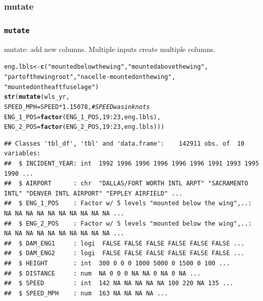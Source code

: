 \documentclass{beamer}\usepackage[]{graphicx}\usepackage[]{color}
\makeatletter
\newcommand{\hlnum}[1]{\textcolor[rgb]{0.686,0.059,0.569}{#1}}%
\newcommand{\hlstr}[1]{\textcolor[rgb]{0.192,0.494,0.8}{#1}}%
\newcommand{\hlcom}[1]{\textcolor[rgb]{0.678,0.584,0.686}{\textit{#1}}}%
\newcommand{\hlopt}[1]{\textcolor[rgb]{0,0,0}{#1}}%
\newcommand{\hlstd}[1]{\textcolor[rgb]{0.345,0.345,0.345}{#1}}%
\newcommand{\hlkwb}[1]{\textcolor[rgb]{0.69,0.353,0.396}{#1}}%
\newcommand{\hlkwc}[1]{\textcolor[rgb]{0.333,0.667,0.333}{#1}}%
\newcommand{\hlkwd}[1]{\textcolor[rgb]{0.737,0.353,0.396}{\textbf{#1}}}%
\newenvironment{kframe}{%
 \def\at@end@of@kframe{}%
 \ifinner\ifhmode%
  \def\at@end@of@kframe{\end{minipage}}%
  \begin{minipage}{\columnwidth}%
 \fi\fi%
 \def\FrameCommand##1{\hskip\@totalleftmargin \hskip-\fboxsep
 \colorbox{shadecolor}{##1}\hskip-\fboxsep
     \hskip-\linewidth \hskip-\@totalleftmargin \hskip\columnwidth}%
 \MakeFramed {\advance\hsize-\width
   \@totalleftmargin\z@ \linewidth\hsize
   \@setminipage}}%
 {\par\unskip\endMakeFramed%
 \at@end@of@kframe}
\newenvironment{knitrout}{}{} %
\makeatother
\begin{document}
\subsubsection{mutate}%
\begin{frame}[fragile]
  \frametitle{{\tt mutate}}
mutate: add new columns. Multiple inputs create multiple columns.
\begin{knitrout}\footnotesize
{}\color{fgcolor}\begin{kframe}
\begin{alltt}
\hlstd{eng.lbls} \hlkwb{<-} \hlkwd{c}\hlstd{(}\hlstr{"mounted below the wing"}\hlstd{,} \hlstr{"mounted above the wing"}\hlstd{,}
              \hlstr{"part of the wing root"}\hlstd{,} \hlstr{"nacelle-mounted on the wing"}\hlstd{,}
              \hlstr{"mounted on the aft fuselage"}\hlstd{)}
\hlkwd{str}\hlstd{(}\hlkwd{mutate}\hlstd{(wls_yr,}
       \hlkwc{SPEED_MPH} \hlstd{= SPEED} \hlopt{*} \hlnum{1.15078}\hlstd{,} \hlcom{# SPEED was in knots}
       \hlkwc{ENG_1_POS} \hlstd{=} \hlkwd{factor}\hlstd{(ENG_1_POS,} \hlnum{19}\hlopt{:}\hlnum{23}\hlstd{, eng.lbls),}
       \hlkwc{ENG_2_POS} \hlstd{=} \hlkwd{factor}\hlstd{(ENG_2_POS,} \hlnum{19}\hlopt{:}\hlnum{23}\hlstd{, eng.lbls)))}
\end{alltt}
\begin{verbatim}
## Classes 'tbl_df', 'tbl' and 'data.frame':	142911 obs. of  10 variables:
##  $ INCIDENT_YEAR: int  1992 1996 1996 1996 1996 1996 1991 1993 1995 1990 ...
##  $ AIRPORT      : chr  "DALLAS/FORT WORTH INTL ARPT" "SACRAMENTO INTL" "DENVER INTL AIRPORT" "EPPLEY AIRFIELD" ...
##  $ ENG_1_POS    : Factor w/ 5 levels "mounted below the wing",..: NA NA NA NA NA NA NA NA NA NA ...
##  $ ENG_2_POS    : Factor w/ 5 levels "mounted below the wing",..: NA NA NA NA NA NA NA NA NA NA ...
##  $ DAM_ENG1     : logi  FALSE FALSE FALSE FALSE FALSE FALSE ...
##  $ DAM_ENG2     : logi  FALSE FALSE FALSE FALSE FALSE FALSE ...
##  $ HEIGHT       : int  300 0 0 0 1000 5000 0 1500 0 100 ...
##  $ DISTANCE     : num  NA 0 0 0 NA NA 0 NA 0 NA ...
##  $ SPEED        : int  142 NA NA NA NA NA 100 220 NA 135 ...
##  $ SPEED_MPH    : num  163 NA NA NA NA ...
\end{verbatim}
\end{kframe}
\end{knitrout}
\end{frame} 
\end{document}
